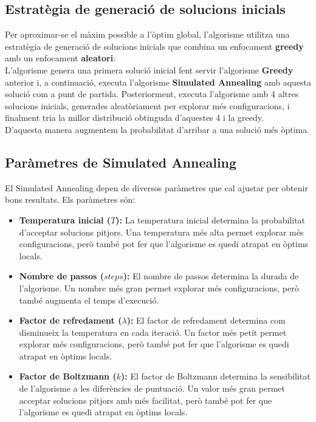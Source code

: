 \documentclass[a4paper,12pt]{report}
\begin{document}
\begin{itemize}
\begin{algorithm}[H]
{{	  %
	}}
\end{algorithm}

\newpage

\subsection{Estratègia de generació de solucions inicials}
Per aproximar-se el màxim possible a l'òptim global, l'algorisme utilitza una estratègia de generació de solucions inicials que combina un enfocament \textbf{greedy} amb un enfocament \textbf{aleatori}:\\
L'algorisme genera una primera solució inicial fent servir l'algorisme \textbf{Greedy} anterior i, a continuació, executa l'algorisme \textbf{Simulated Annealing} amb aquesta solució com a punt de partida.
Posteriorment, executa l'algorisme amb 4 altres solucions inicials, generades aleatòriament per explorar més configuracions, i finalment tria la millor distribució obtinguda d'aquestes 4 i la greedy.\\
D'aquesta manera augmentem la probabilitat d'arribar a una solució més òptima.

\subsection{Paràmetres de Simulated Annealing}

El Simulated Annealing depen de diversos paràmetres que cal ajustar per obtenir bons resultats. Els paràmetres són:

\begin{itemize}
	\item \textbf{Temperatura inicial (\(T\)):} La temperatura inicial determina la probabilitat d'acceptar solucions pitjors. Una temperatura més alta permet explorar més configuracions, però també pot fer que l'algorisme es quedi atrapat en òptims locals. 
	\item \textbf{Nombre de passos (\(steps\)):} El nombre de passos determina la durada de l'algorisme. Un nombre més gran permet explorar més configuracions, però també augmenta el temps d'execució. 
	\item \textbf{Factor de refredament (\(\lambda\)):} El factor de refredament determina com disminueix la temperatura en cada iteració. Un factor més petit permet explorar més configuracions, però també pot fer que l'algorisme es quedi atrapat en òptims locals. 
	\item \textbf{Factor de Boltzmann (\(k\)):} El factor de Boltzmann determina la sensibilitat de l'algorisme a les diferències de puntuació. Un valor més gran permet acceptar solucions pitjors amb més facilitat, però també pot fer que l'algorisme es quedi atrapat en òptims locals. 
\end{itemize}


\end{itemize}
\end{document}
